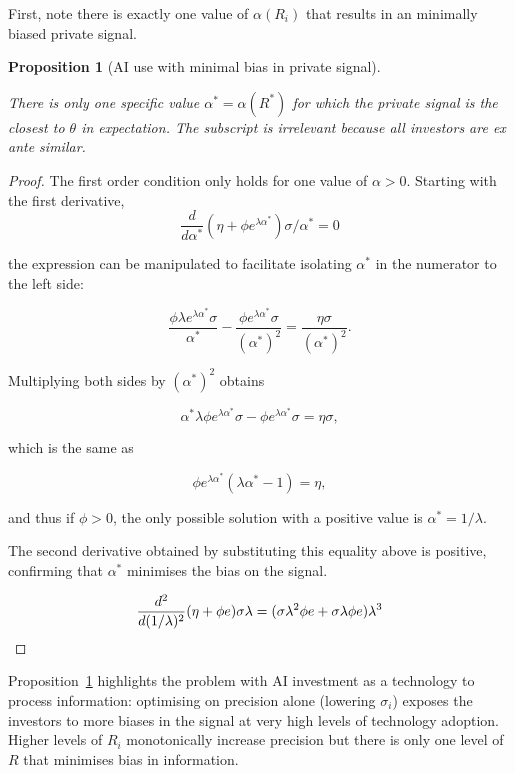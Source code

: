 \documentclass[
]{article}
\theoremstyle{plain}
\newtheorem{proposition}{Proposition}[section]
\theoremstyle{remark}
\begin{document}
First, note there is exactly one value of \(\alpha(R_i)\) that results
in an minimally biased private signal.

\begin{proposition}[AI use with minimal bias in private
signal]\protect\hypertarget{prp-alphainvestunbiased}{}\label{prp-alphainvestunbiased}

There is only one specific value \(\alpha^* = \alpha(R^*)\) for which
the private signal is the closest to \(\theta\) in expectation. The
subscript is irrelevant because all investors are ex ante similar.

\end{proposition}

\begin{proof}

The first order condition only holds for one value of \(\alpha > 0\).
Starting with the first derivative, \[
\frac{d}{d \alpha^*} (\eta + \phi e^{\lambda \alpha^*}) \sigma / \alpha^* = 0
\]

the expression can be manipulated to facilitate isolating \(\alpha^*\)
in the numerator to the left side:

\[
\frac{\phi \lambda e^{\lambda \alpha^*} \sigma}{\alpha^*} - \frac{\phi e^{\lambda \alpha^*}\sigma}{(\alpha^*)^2} = \frac{\eta \sigma}{(\alpha^*)^2}.
\]

Multiplying both sides by \((\alpha^*)^2\) obtains

\[
\alpha^* \lambda \phi e^{\lambda \alpha^*} \sigma - \phi e^{\lambda \alpha^*}\sigma = \eta \sigma,
\]

which is the same as

\[
\phi e^{\lambda \alpha^*} (\lambda \alpha^* - 1)= \eta,
\]

and thus if \(\phi > 0\), the only possible solution with a positive
value is \(\alpha^* = 1/\lambda\).

The second derivative obtained by substituting this equality above is
positive, confirming that \(\alpha^*\) minimises the bias on the signal.

\[
\frac{d^2}{d (1/\lambda)^2} (\eta + \phi e) \sigma \lambda = (\sigma \lambda^2 \phi e + \sigma \lambda \phi e)\lambda^3 \\
\]

\end{proof}

Proposition~\ref{prp-alphainvestunbiased} highlights the problem with AI
investment as a technology to process information: optimising on
precision alone (lowering \(\sigma_i\)) exposes the investors to more
biases in the signal at very high levels of technology adoption. Higher
levels of \(R_i\) monotonically increase precision but there is only one
level of \(R\) that minimises bias in information.
\end{document}
